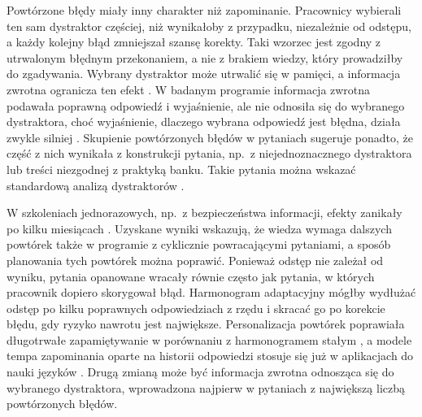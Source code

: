 Powtórzone błędy miały inny charakter niż zapominanie. Pracownicy wybierali ten sam dystraktor
częściej, niż wynikałoby z przypadku, niezależnie od odstępu, a każdy kolejny błąd zmniejszał szansę
korekty. Taki wzorzec jest zgodny z utrwalonym błędnym przekonaniem, a nie z brakiem wiedzy, który
prowadziłby do zgadywania. Wybrany dystraktor może utrwalić się w pamięci, a informacja zwrotna
ogranicza ten efekt \citep{butler2008}. W badanym programie informacja zwrotna podawała poprawną
odpowiedź i wyjaśnienie, ale nie odnosiła się do wybranego dystraktora, choć wyjaśnienie, dlaczego
wybrana odpowiedź jest błędna, działa zwykle silniej \citep{shute2008}. Skupienie powtórzonych błędów
w \PersistTopItems{} pytaniach sugeruje ponadto, że część z nich wynikała z konstrukcji pytania, np.\
z niejednoznacznego dystraktora lub treści niezgodnej z praktyką banku. Takie pytania można wskazać
standardową analizą dystraktorów \citep{gierl2017}.

W szkoleniach jednorazowych, np.\ z bezpieczeństwa informacji, efekty zanikały po kilku miesiącach
\citep{reinheimer2020}. Uzyskane wyniki wskazują, że wiedza wymaga dalszych powtórek także w programie
z cyklicznie powracającymi pytaniami, a sposób planowania tych powtórek można poprawić. Ponieważ odstęp
nie zależał od wyniku, pytania opanowane wracały równie często jak pytania, w których pracownik dopiero
skorygował błąd. Harmonogram adaptacyjny mógłby wydłużać odstęp po kilku poprawnych odpowiedziach
z rzędu i skracać go po korekcie błędu, gdy ryzyko nawrotu jest największe. Personalizacja powtórek
poprawiała długotrwałe zapamiętywanie w porównaniu z harmonogramem stałym \citep{lindsey2014}, a modele
tempa zapominania oparte na historii odpowiedzi stosuje się już w aplikacjach do nauki języków
\citep{settles2016}. Drugą zmianą może być informacja zwrotna odnosząca się do wybranego dystraktora,
wprowadzona najpierw w pytaniach z największą liczbą powtórzonych błędów.

